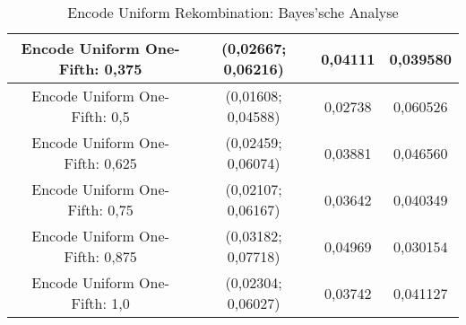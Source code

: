 \begin{table}[H]
\begin{tabular}{c | c | c | c}
		\hline
		Encode Uniform One-Fifth: 0,375 & (0,02667; 0,06216) & 0,04111 & 0,039580\\
		\hline
		Encode Uniform One-Fifth: 0,5 & \color{Green}(0,01608; 0,04588)\color{black} & \color{Green}0,02738\color{black} & \color{Green}0,060526\color{black}\\
		\hline
		Encode Uniform One-Fifth: 0,625 & (0,02459; 0,06074) & 0,03881 & 0,046560\\
		\hline
		Encode Uniform One-Fifth: 0,75 & (0,02107; 0,06167) & 0,03642 & 0,040349\\
		\hline
		Encode Uniform One-Fifth: 0,875 & \color{red}(0,03182; 0,07718)\color{black} &\color{red} 0,04969\color{black} & \color{red}0,030154\color{black}\\
		\hline
		Encode Uniform One-Fifth: 1,0 & (0,02304; 0,06027) & 0,03742 & 0,041127\\
	\end{tabular}
	\caption{Encode Uniform Rekombination: Bayes'sche Analyse}
	\label{table:encodeUniformBayesian}
\end{table}



